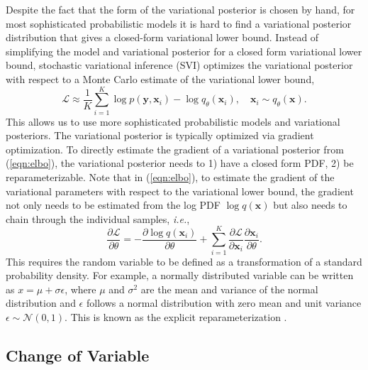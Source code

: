 \documentclass[twoside]{article}
\newcommand{\yV}{\mathbf{y}}
\newcommand{\xV}{\mathbf{x}}
\newcommand{\bound}{\mathcal{L}}
\newcommand{\ie}{\textit{i.e.}}
\begin{document}
Despite the fact that the form of the variational posterior is chosen by hand, for most sophisticated probabilistic models it is hard to find a variational posterior distribution that gives a closed-form variational lower bound. Instead of simplifying the model and variational posterior for a closed form variational lower bound, stochastic variational inference (SVI) optimizes the variational posterior with respect to a Monte Carlo estimate of the variational lower bound,
\begin{equation}
\bound \approx \frac{1}{K} \sum_{i=1}^K \log p(\yV, \xV_i)-\log q_\theta(\xV_i), \quad \xV_i \sim q_\theta(\xV). \label{eqn:elbo}
\end{equation}
This allows us to use more sophisticated probabilistic models and variational posteriors. The variational posterior is typically optimized via gradient optimization. To directly estimate the gradient of a variational posterior from (\ref{eqn:elbo}), the variational posterior needs to 1) have a closed form PDF, 2) be reparameterizable.
%
Note that in (\ref{eqn:elbo}), to estimate the gradient of the variational parameters with respect to the variational lower bound, the gradient not only needs to be estimated from the log PDF $\log q(\xV)$ but also needs to chain through the individual samples, \ie, 
\begin{equation}
\frac{\partial \bound}{\partial \theta} = -\frac{\partial \log q(\xV_i)}{\partial \theta} + \sum_{i=1}^K \frac{\partial \bound}{\partial \xV_i} \frac{\partial \xV_i}{\partial \theta}. 
\end{equation}
%
This requires the random variable to be defined as a transformation of a standard probability density. For example, a normally distributed variable can be written as $x = \mu + \sigma\epsilon$, where $\mu$ and $\sigma^2$ are the mean and variance of the normal distribution and $\epsilon$ follows a normal distribution with zero mean and unit variance $\epsilon \sim \mathcal{N}(0, 1)$. This is known as  the explicit reparameterization \citep{KingmaWelling2014}. 


\subsection{Change of Variable}
\end{document}
